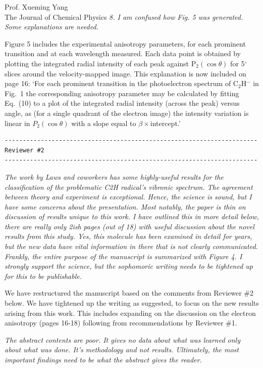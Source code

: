 \documentclass[a4paper,12pt]{letter}
\begin{document}
\begin{sf}
\begin{letter}{%
Prof. Xueming Yang\\
The Journal of Chemical Physics
}
\emph{8. I am confused how Fig. 5 was generated. Some explanations are needed.}

Figure 5 includes the experimental anisotropy parameters, for each prominent transition and at each wavelength measured. Each data point is obtained by plotting the integrated radial intensity of each peak against P$_2(\cos\theta)$ for 5$^\circ$ slices around the velocity-mapped image. This explanation is now included on page 16: `For each prominent transition in the photoelectron spectrum of C$_2$H$^-$ in Fig.~1 the corresponding anisotropy parameter may be calculated by fitting Eq.~(10) to a plot of the integrated radial intensity (across the peak) versus angle, as (for a single quadrant of the electron image) the intensity variation is linear in $P_2(\cos\theta)$ with a slope equal to $\beta\times$intercept.'
\vspace*{1ex}
\begin{verbatim}
----------------------------------------------------------------------
Reviewer #2  
----------------------------------------------------------------------
\end{verbatim}
\vspace*{-2ex}
\emph{The work by Laws and coworkers has some highly-useful results for the classification of the problematic C2H radical's vibronic spectrum. The agreement between theory and experiment is exceptional. Hence, the science is sound, but I have some concerns about the presentation. Most notably, the paper is thin on discussion of results unique to this work. I have outlined this in more detail below, there are really only 2ish pages (out of 18) with useful discussion about the novel results from this study. Yes, this molecule has been examined in detail for years, but the new data have vital information in there that is not clearly communicated. Frankly, the entire purpose of the manuscript is summarized with Figure 4. I strongly support the science, but the sophomoric writing needs to be tightened up for this to be publishable.}

We have restructured the manuscript based on the comments from Reviewer \#2 below. We have tightened up the writing as suggested, to focus on the new results arising from this work. This includes expanding on the discussion on the electron anisotropy (pages 16-18) following from  recommendations by Reviewer \#1.

\emph{The abstract contents are poor. It gives no data about what was learned only about what was done. It's methodology and not results. Ultimately, the most important findings need to be what the abstract gives the reader.}


\end{letter}
\end{sf}
\end{document}
